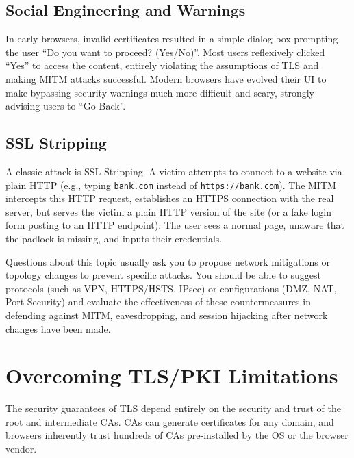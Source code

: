 \subsection{Social Engineering and Warnings}
In early browsers, invalid certificates resulted in a simple dialog box prompting the user ``Do you want to proceed? (Yes/No)''. Most users reflexively clicked ``Yes'' to access the content, entirely violating the assumptions of TLS and making MITM attacks successful. Modern browsers have evolved their UI to make bypassing security warnings much more difficult and scary, strongly advising users to ``Go Back''.

\subsection{SSL Stripping}
A classic attack is SSL Stripping. A victim attempts to connect to a website via plain HTTP (e.g., typing \texttt{bank.com} instead of \texttt{https://bank.com}). The MITM intercepts this HTTP request, establishes an HTTPS connection with the real server, but serves the victim a plain HTTP version of the site (or a fake login form posting to an HTTP endpoint). The user sees a normal page, unaware that the padlock is missing, and inputs their credentials.

\begin{tcolorbox}[colback=blue!5!white,colframe=blue!75!black,title=Exam Insight]
Questions about this topic usually ask you to propose network mitigations or topology changes to prevent specific attacks. You should be able to suggest protocols (such as VPN, HTTPS/HSTS, IPsec) or configurations (DMZ, NAT, Port Security) and evaluate the effectiveness of these countermeasures in defending against MITM, eavesdropping, and session hijacking after network changes have been made.
\end{tcolorbox}

\section{Overcoming TLS/PKI Limitations}
The security guarantees of TLS depend entirely on the security and trust of the root and intermediate CAs. CAs can generate certificates for any domain, and browsers inherently trust hundreds of CAs pre-installed by the OS or the browser vendor.

